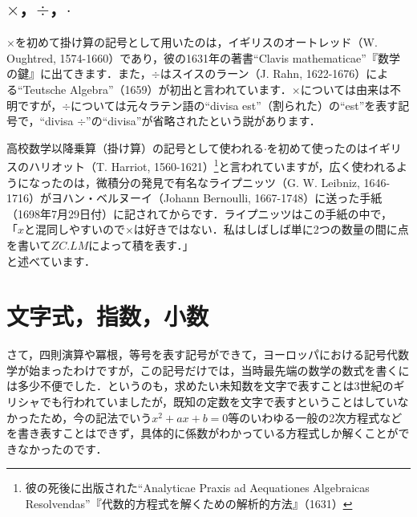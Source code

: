 \documentclass[8pt,a4j]{jreport}
\begin{document}
\subsection{$\times$，$\div$，$\cdot$}\label{乗除}
$\times$を初めて掛け算の記号として用いたのは，イギリスのオートレッド（W. Oughtred, 1574-1660）であり，彼の1631年の著書``Clavis mathematicae''『数学の鍵』に出てきます．また，$\div$はスイスのラーン（J. Rahn, 1622-1676）による``Teutsche Algebra''（1659）が初出と言われています．$\times$については由来は不明ですが，$\div$については元々ラテン語の``divisa est''（割られた）の``est''を表す記号で，``divisa $\div$''の``divisa''が省略されたという説があります．

高校数学以降乗算（掛け算）の記号として使われる$\cdot$を初めて使ったのはイギリスのハリオット（T. Harriot, 1560-1621）\footnote{彼の死後に出版された``Analyticae Praxis ad Aequationes Algebraicas Resolvendas''『代数的方程式を解くための解析的方法』（1631）}と言われていますが，広く使われるようになったのは，微積分の発見で有名なライプニッツ（G. W. Leibniz, 1646-1716）がヨハン・ベルヌーイ（Johann Bernoulli, 1667-1748）に送った手紙（1698年7月29日付）に記されてからです．ライプニッツはこの手紙の中で，\\
「$x$と混同しやすいので$\times$は好きではない．私はしばしば単に2つの数量の間に点を書いて$ZC.LM$によって積を表す．」\\
と述べています．

\section{文字式，指数，小数}\label{B}
さて，四則演算や冪根，等号を表す記号ができて，ヨーロッパにおける記号代数学が始まったわけですが，この記号だけでは，当時最先端の数学の数式を書くには多少不便でした．というのも，求めたい未知数を文字で表すことは3世紀のギリシャでも行われていましたが，既知の定数を文字で表すということはしていなかったため，今の記法でいう$x^2+ax+b=0$等のいわゆる一般の2次方程式などを書き表すことはできず，具体的に係数がわかっている方程式しか解くことができなかったのです．
\end{document}
